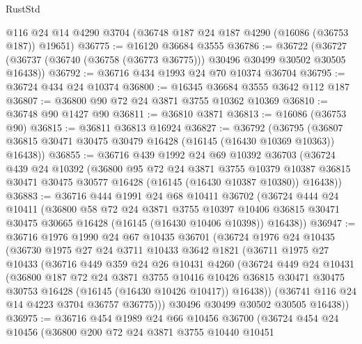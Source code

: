\begin{lexlean}{RustStd}
\begin{coremodule}
    @116
    @24
    @14
    @4290
    @3704
    (@36748 @187 @24 @187 @4290 (@16086 (@36753 @187)) @19651)
@36775 := @16120 @36684 @3555
@36786 := @36722
    (@36727 (@36737 (@36740 (@36758 (@36773 @36775))) @30496 @30499 @30502 @30505 @16438))
@36792 := @36716 @434 @1993 @24 @70 @10374 @36704
@36795 := @36724 @434 @24 @10374
@36800 := @16345 @36684 @3555 @3642 @112 @187
@36807 := @36800 @90 @72 @24 @3871 @3755 @10362 @10369
@36810 := @36748 @90 @1427 @90
@36811 := @36810 @3871
@36813 := @16086 (@36753 @90)
@36815 := @36811 @36813 @16924
@36827 := @36792
    (@36795 (@36807 @36815 @30471 @30475 @30479 @16428 (@16145 (@16430 @10369 @10363)) @16438))
@36855 := @36716
    @439
    @1992
    @24
    @69
    @10392
    @36703
    (@36724
      @439
      @24
      @10392
      (@36800
        @95
        @72
        @24
        @3871
        @3755
        @10379
        @10387
        @36815
        @30471
        @30475
        @30577
        @16428
        (@16145 (@16430 @10387 @10380))
        @16438))
@36883 := @36716
    @444
    @1991
    @24
    @68
    @10411
    @36702
    (@36724
      @444
      @24
      @10411
      (@36800
        @58
        @72
        @24
        @3871
        @3755
        @10397
        @10406
        @36815
        @30471
        @30475
        @30665
        @16428
        (@16145 (@16430 @10406 @10398))
        @16438))
@36947 := @36716
    @1976
    @1990
    @24
    @67
    @10435
    @36701
    (@36724
      @1976
      @24
      @10435
      (@36730
        @1975
        @27
        @24
        @3711
        @10433
        @3642
        @1821
        (@36711
          @1975
          @27
          @10433
          (@36716
            @449
            @359
            @24
            @26
            @10431
            @4260
            (@36724
              @449
              @24
              @10431
              (@36800
                @187
                @72
                @24
                @3871
                @3755
                @10416
                @10426
                @36815
                @30471
                @30475
                @30753
                @16428
                (@16145 (@16430 @10426 @10417))
                @16438))
            (@36741 @116 @24 @14 @4223 @3704 @36757 @36775)))
        @30496
        @30499
        @30502
        @30505
        @16438))
@36975 := @36716
    @454
    @1989
    @24
    @66
    @10456
    @36700
    (@36724
      @454
      @24
      @10456
      (@36800
        @200
        @72
        @24
        @3871
        @3755
        @10440
        @10451

\end{coremodule}
\end{lexlean}
